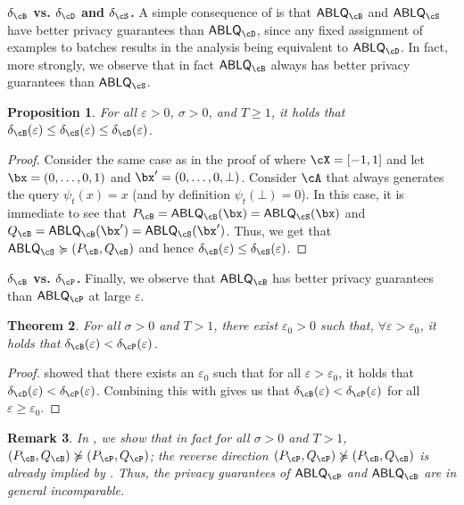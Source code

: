 \documentclass[twoside]{article}
\newtheorem{theorem}{Theorem}[section]
\newtheorem{proposition}[theorem]{Proposition}
\newtheorem{remark}[theorem]{Remark}
\theoremstyle{definition}
\newcommand{\eps}{\varepsilon}
\newcommand{\ABLQ}{\mathsf{ABLQ}}
\newcommand{\ABLQD}{\ABLQ_{\cD}}
\newcommand{\ABLQP}{\ABLQ_{\cP}}
\newcommand{\ABLQS}{\ABLQ_{\cS}}
\newcommand{\ABLQB}{\ABLQ_{\cB}}
\newcommand{\deltaD}{\delta_{\cD}}
\newcommand{\deltaP}{\delta_{\cP}}
\newcommand{\deltaS}{\delta_{\cS}}
\newcommand{\deltaB}{\delta_{\cB}}
\newcommand{\PB}{P_{\cB}}
\newcommand{\QB}{Q_{\cB}}
\newcommand{\PP}{P_{\cP}}
\newcommand{\QP}{Q_{\cP}}
\newcommand{\dominates}{\succcurlyeq}%
\begin{document}
{\bf\boldmath $\deltaB$ vs. $\deltaD$ and $\deltaS$.}
A simple consequence of  is that $\ABLQB$ and $\ABLQS$ have better privacy guarantees than $\ABLQD$, since any fixed assignment of examples to batches results in the analysis being equivalent to $\ABLQD$.
In fact, more strongly, we observe that in fact $\ABLQB$ always has better privacy guarantees than $\ABLQS$.
\begin{proposition}\label{prop:B-vs-S-and-D}
For all $\eps > 0$, $\sigma > 0$, and $T \ge 1$, it holds that $\deltaB(\eps) \le \deltaS(\eps) \le \deltaD(\eps)$.
\end{proposition}
\begin{proof}
Consider the same case as in the proof of  where $\cX = [-1, 1]$ and let $\bx = (0, \ldots, 0, 1)$ and $\bx' = (0, \ldots, 0, \bot)$. Consider
$\cA$ that always generates the query $\psi_t(x) = x$ (and by definition $\psi_t(\bot) = 0$). In this case, it is immediate to see that $\PB = \ABLQB(\bx) = \ABLQS(\bx)$ and $\QB = \ABLQB(\bx') = \ABLQS(\bx')$. Thus, we get that $\ABLQS \dominates (\PB, \QB)$ and hence $\deltaB(\eps) \le \deltaS(\eps)$.
\end{proof}

{\bf\boldmath $\deltaB$ vs. $\deltaP$.}
Finally, we observe that $\ABLQB$ has better privacy guarantees than $\ABLQP$ at large $\eps$.

\begin{theorem}\label{thm:bnb-vs-poisson}
For all $\sigma > 0$ and $T > 1$, there exist $\eps_0 > 0$ such that, $\forall \eps > \eps_0$, it holds that $\deltaB(\eps) < \deltaP(\eps)$.
\end{theorem}
\begin{proof}%
\citet[Theorem 4.2]{chua24private} showed that there exists an $\eps_0$ such that for all $\eps > \eps_0$, it holds that $\deltaD(\eps) < \deltaP(\eps)$. Combining this with  gives us that $\deltaB(\eps) < \deltaP(\eps)$ for all $\eps \ge \eps_0$.
\end{proof}

\begin{remark}\label{rem:bnb-poisson-incomparable}
In , we show that in fact for all $\sigma > 0$ and $T > 1$, $(\PB, \QB) \not\dominates (\PP, \QP)$; the reverse direction $(\PP, \QP) \not\dominates (\PB, \QB)$ is already implied by . Thus, the privacy guarantees of $\ABLQP$ and $\ABLQB$ are in general incomparable.
\end{remark}
\end{document}
